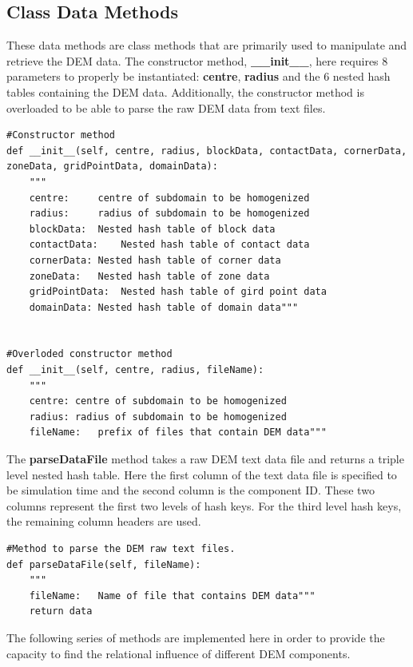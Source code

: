 \subsection{Class Data Methods}

These data methods are class methods that are primarily used to manipulate and retrieve the DEM data. The constructor method, \textbf{\_\_init\_\_}, here requires 8 parameters to properly be instantiated: \textbf{centre}, \textbf{radius} and the 6 nested hash tables containing the DEM data. Additionally, the constructor method is overloaded to be able to parse the raw DEM data from text files.

\begin{lstlisting}[frame=single] 
#Constructor method
def __init__(self, centre, radius, blockData, contactData, cornerData, zoneData, gridPointData, domainData):
	"""
	centre:		centre of subdomain to be homogenized
	radius:		radius of subdomain to be homogenized
	blockData:	Nested hash table of block data
	contactData:	Nested hash table of contact data
	cornerData:	Nested hash table of corner data
	zoneData:	Nested hash table of zone data
	gridPointData:	Nested hash table of gird point data
	domainData:	Nested hash table of domain data"""
	
	
#Overloded constructor method
def __init__(self, centre, radius, fileName):
	"""
	centre:	centre of subdomain to be homogenized
	radius:	radius of subdomain to be homogenized
	fileName:	prefix of files that contain DEM data"""
\end{lstlisting}
	
The \textbf{parseDataFile} method takes a raw DEM text data file and returns a triple level nested hash table. Here the first column of the text data file is specified to be simulation time and the second column is the component ID. These two columns represent the first two levels of hash keys. For the third level hash keys, the remaining column headers are used. 
	
\begin{lstlisting}[frame=single] 
#Method to parse the DEM raw text files.
def parseDataFile(self, fileName):
	"""
	fileName:	Name of file that contains DEM data"""
	return data
\end{lstlisting}

The following series of methods are implemented here in order to provide the capacity to find the relational influence of different DEM components. 

